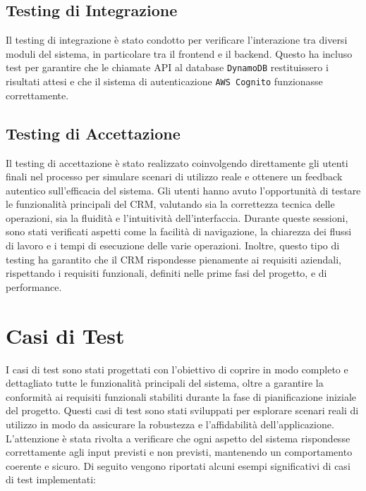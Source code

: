 \documentclass[target=bach,aauheader=,style=]{thud}
\begin{document}
\subsection{Testing di Integrazione}
Il testing di integrazione è stato condotto per verificare l'interazione tra diversi moduli del sistema, in particolare tra il frontend e il backend. Questo ha incluso test per garantire che le chiamate API al database \texttt{DynamoDB} restituissero i risultati attesi e che il sistema di autenticazione \texttt{AWS Cognito} funzionasse correttamente.

\subsection{Testing di Accettazione}
Il testing di accettazione è stato realizzato coinvolgendo direttamente gli utenti finali nel processo per simulare scenari di utilizzo reale e ottenere un feedback autentico sull'efficacia del sistema. Gli utenti hanno avuto l'opportunità di testare le funzionalità principali del CRM, valutando sia la correttezza tecnica delle operazioni, sia la fluidità e l'intuitività dell'interfaccia. Durante queste sessioni, sono stati verificati aspetti come la facilità di navigazione, la chiarezza dei flussi di lavoro e i tempi di esecuzione delle varie operazioni. Inoltre, questo tipo di testing ha garantito che il CRM rispondesse pienamente ai requisiti aziendali, rispettando i requisiti funzionali, definiti nelle prime fasi del progetto, e di performance.

\section{Casi di Test}
I casi di test sono stati progettati con l'obiettivo di coprire in modo completo e dettagliato tutte le funzionalità principali del sistema, oltre a garantire la conformità ai requisiti funzionali stabiliti durante la fase di pianificazione iniziale del progetto. Questi casi di test sono stati sviluppati per esplorare scenari reali di utilizzo in modo da assicurare la robustezza e l'affidabilità dell'applicazione. L'attenzione è stata rivolta a verificare che ogni aspetto del sistema rispondesse correttamente agli input previsti e non previsti, mantenendo un comportamento coerente e sicuro.  Di seguito vengono riportati alcuni esempi significativi di casi di test implementati:
\end{document}
